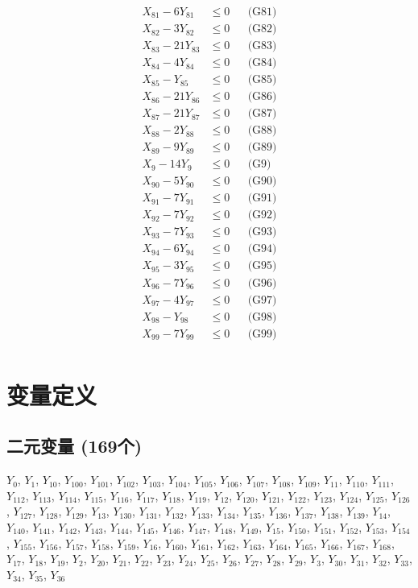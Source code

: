 \documentclass[a4paper,10pt]{article}
\begin{document}
{\begin{align}
X_{81} - 6Y_{81} &\leq 0 && \text{(G81)} \\
X_{82} - 3Y_{82} &\leq 0 && \text{(G82)} \\
X_{83} - 21Y_{83} &\leq 0 && \text{(G83)} \\
X_{84} - 4Y_{84} &\leq 0 && \text{(G84)} \\
X_{85} - Y_{85} &\leq 0 && \text{(G85)} \\
X_{86} - 21Y_{86} &\leq 0 && \text{(G86)} \\
X_{87} - 21Y_{87} &\leq 0 && \text{(G87)} \\
X_{88} - 2Y_{88} &\leq 0 && \text{(G88)} \\
X_{89} - 9Y_{89} &\leq 0 && \text{(G89)} \\
X_{9} - 14Y_{9} &\leq 0 && \text{(G9)} \\
X_{90} - 5Y_{90} &\leq 0 && \text{(G90)} \\
\allowbreak
X_{91} - 7Y_{91} &\leq 0 && \text{(G91)} \\
X_{92} - 7Y_{92} &\leq 0 && \text{(G92)} \\
X_{93} - 7Y_{93} &\leq 0 && \text{(G93)} \\
X_{94} - 6Y_{94} &\leq 0 && \text{(G94)} \\
X_{95} - 3Y_{95} &\leq 0 && \text{(G95)} \\
X_{96} - 7Y_{96} &\leq 0 && \text{(G96)} \\
X_{97} - 4Y_{97} &\leq 0 && \text{(G97)} \\
X_{98} - Y_{98} &\leq 0 && \text{(G98)} \\
X_{99} - 7Y_{99} &\leq 0 && \text{(G99)} \\
\end{align}}

\section{变量定义}

\subsection{二元变量 (169个)}

{\small $Y_{0}$, $Y_{1}$, $Y_{10}$, $Y_{100}$, $Y_{101}$, $Y_{102}$, $Y_{103}$, $Y_{104}$, $Y_{105}$, $Y_{106}$, $Y_{107}$, $Y_{108}$, $Y_{109}$, $Y_{11}$, $Y_{110}$, $Y_{111}$, $Y_{112}$, $Y_{113}$, $Y_{114}$, $Y_{115}$, $Y_{116}$, $Y_{117}$, $Y_{118}$, $Y_{119}$, $Y_{12}$, $Y_{120}$, $Y_{121}$, $Y_{122}$, $Y_{123}$, $Y_{124}$, $Y_{125}$, $Y_{126}$, $Y_{127}$, $Y_{128}$, $Y_{129}$, $Y_{13}$, $Y_{130}$, $Y_{131}$, $Y_{132}$, $Y_{133}$, $Y_{134}$, $Y_{135}$, $Y_{136}$, $Y_{137}$, $Y_{138}$, $Y_{139}$, $Y_{14}$, $Y_{140}$, $Y_{141}$, $Y_{142}$, $Y_{143}$, $Y_{144}$, $Y_{145}$, $Y_{146}$, $Y_{147}$, $Y_{148}$, $Y_{149}$, $Y_{15}$, $Y_{150}$, $Y_{151}$, $Y_{152}$, $Y_{153}$, $Y_{154}$, $Y_{155}$, $Y_{156}$, $Y_{157}$, $Y_{158}$, $Y_{159}$, $Y_{16}$, $Y_{160}$, $Y_{161}$, $Y_{162}$, $Y_{163}$, $Y_{164}$, $Y_{165}$, $Y_{166}$, $Y_{167}$, $Y_{168}$, $Y_{17}$, $Y_{18}$, $Y_{19}$, $Y_{2}$, $Y_{20}$, $Y_{21}$, $Y_{22}$, $Y_{23}$, $Y_{24}$, $Y_{25}$, $Y_{26}$, $Y_{27}$, $Y_{28}$, $Y_{29}$, $Y_{3}$, $Y_{30}$, $Y_{31}$, $Y_{32}$, $Y_{33}$, $Y_{34}$, $Y_{35}$, $Y_{36}$}
\end{document}
